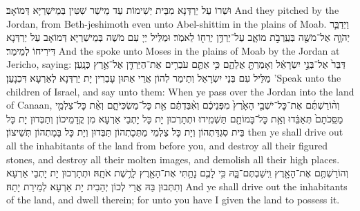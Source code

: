 {וּשְׁרוֹ עַל יַרְדְּנָא מִבֵּית יְשִׁימוֹת עַד מֵישַׁר שִׁטִּין בְּמֵישְׁרַיָּא דְּמוֹאָב׃}
{And they pitched by the Jordan, from Beth-jeshimoth even unto Abel-shittim in the plains of Moab.}{}
{וַיְדַבֵּ֧ר יְהֹוָ֛ה אֶל־מֹשֶׁ֖ה בְּעַֽרְבֹ֣ת מוֹאָ֑ב עַל־יַרְדֵּ֥ן יְרֵח֖וֹ לֵאמֹֽר׃}
{וּמַלֵּיל יְיָ עִם מֹשֶׁה בְּמֵישְׁרַיָּא דְּמוֹאָב עַל יַרְדְּנָא דִּירִיחוֹ לְמֵימַר׃}
{And the \lord\space spoke unto Moses in the plains of Moab by the Jordan at Jericho, saying:}{}
{דַּבֵּר֙ אֶל־בְּנֵ֣י יִשְׂרָאֵ֔ל וְאָמַרְתָּ֖ אֲלֵהֶ֑ם כִּ֥י אַתֶּ֛ם עֹבְרִ֥ים אֶת־הַיַּרְדֵּ֖ן אֶל־אֶ֥רֶץ כְּנָֽעַן׃
}
{מַלֵּיל עִם בְּנֵי יִשְׂרָאֵל וְתֵימַר לְהוֹן אֲרֵי אַתּוּן עָבְרִין יָת יַרְדְּנָא לְאַרְעָא דִּכְנָעַן׃}
{’Speak unto the children of Israel, and say unto them: When ye pass over the Jordan into the land of Canaan,}{}
{וְה֨וֹרַשְׁתֶּ֜ם אֶת־כׇּל־יֹשְׁבֵ֤י הָאָ֙רֶץ֙ מִפְּנֵיכֶ֔ם וְאִ֨בַּדְתֶּ֔ם אֵ֖ת כׇּל־מַשְׂכִּיֹּתָ֑ם וְאֵ֨ת כׇּל־צַלְמֵ֤י מַסֵּֽכֹתָם֙ תְּאַבֵּ֔דוּ וְאֵ֥ת כׇּל־בָּמוֹתָ֖ם תַּשְׁמִֽידוּ׃
}
{וּתְתָרְכוּן יָת כָּל יָתְבֵי אַרְעָא מִן קֳדָמֵיכוֹן וְתַבְּדוּן יָת כָּל בֵּית סִגְדַּתְהוֹן וְיָת כָּל צַלְמֵי מַתְּכָתְהוֹן תַּבְּדוּן וְיָת כָּל בָּמָתְהוֹן תְּשֵׁיצוֹן׃}
{then ye shall drive out all the inhabitants of the land from before you, and destroy all their figured stones, and destroy all their molten images, and demolish all their high places.}{}
{וְהוֹרַשְׁתֶּ֥ם אֶת־הָאָ֖רֶץ וִֽישַׁבְתֶּם־בָּ֑הּ כִּ֥י לָכֶ֛ם נָתַ֥תִּי אֶת־הָאָ֖רֶץ לָרֶ֥שֶׁת אֹתָֽהּ׃
}
{וּתְתָרְכוּן יָת יָתְבֵי אַרְעָא וְתִתְּבוּן בַּהּ אֲרֵי לְכוֹן יְהַבִית יָת אַרְעָא לְמֵירַת יָתַהּ׃}
{And ye shall drive out the inhabitants of the land, and dwell therein; for unto you have I given the land to possess it.}{}
